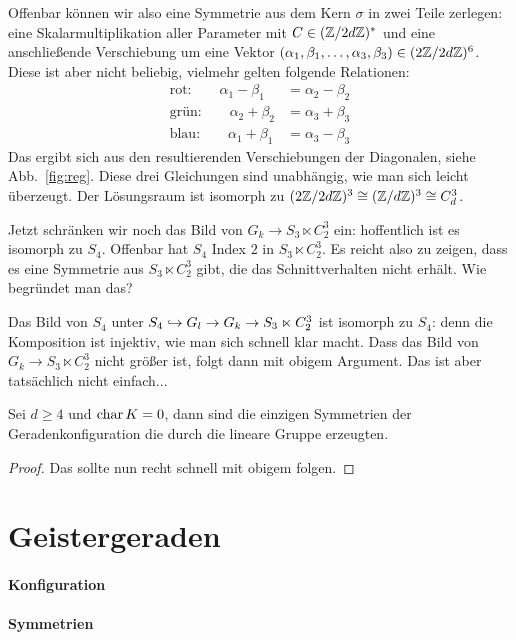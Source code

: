 Offenbar können wir also eine Symmetrie aus dem Kern $\sigma$ in zwei Teile zerlegen: eine Skalarmultiplikation aller Parameter mit $C \in (\Zmod 2dZ)^*$ und eine anschließende Verschiebung um eine Vektor $(\alpha_1, \beta_1, \dots, \alpha_3, \beta_3) \in (2\Zmod 2dZ)^6$. Diese ist aber nicht beliebig, vielmehr gelten folgende Relationen:
\begin{align*}
\text{rot:}\qquad  \alpha_1 - \beta_1 &= \alpha_2 - \beta_2 \\
\text{grün:}\qquad \alpha_2 + \beta_2 &= \alpha_3 + \beta_3 \\
\text{blau:}\qquad \alpha_1 + \beta_1 &= \alpha_3 - \beta_3
\end{align*}
Das ergibt sich aus den resultierenden Verschiebungen der Diagonalen, siehe Abb.~\ref{fig:reg}. Diese drei Gleichungen sind unabhängig, wie man sich leicht überzeugt. Der Lösungsraum ist isomorph zu $(2\Zmod 2dZ)^3 \cong (\Zmod dZ)^3 \cong C_d^3$.

Jetzt schränken wir noch das Bild von $G_k \to S_3 \ltimes C_2^3$ ein: hoffentlich ist es isomorph zu $S_4$. Offenbar hat $S_4$ Index $2$ in $S_3 \ltimes C_2^3$. Es reicht also zu zeigen, dass es eine Symmetrie aus $S_3 \ltimes C_2^3$ gibt, die das Schnittverhalten nicht erhält. \note Wie begründet man das?

Das Bild von $S_4$ unter $S_4 \hookrightarrow G_l \rightarrow G_k \rightarrow S_3 \ltimes C_2^3$ ist isomorph zu $S_4$: denn die Komposition ist injektiv, wie man sich schnell klar macht. Dass das Bild von $G_k \to S_3 \ltimes C_2^3$ nicht größer ist, folgt dann mit obigem Argument. Das ist aber tatsächlich nicht einfach...

\begin{theorem}
Sei $d \geq 4$ und $\operatorname{char} K=0$, dann sind die einzigen Symmetrien der Geradenkonfiguration die durch die lineare Gruppe erzeugten.
\end{theorem}
\begin{proof}
Das sollte nun recht schnell mit obigem folgen.
\end{proof}

\section{Geistergeraden}
\paragraph{Konfiguration}
\paragraph{Symmetrien}
